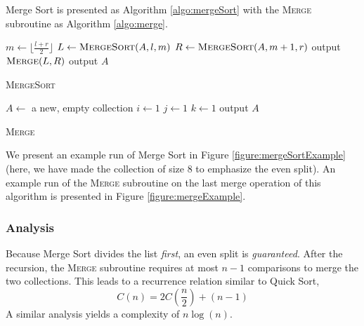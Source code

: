Merge Sort is presented as Algorithm \ref{algo:mergeSort} with the
\textsc{Merge} subroutine as Algorithm \ref{algo:merge}.

\begin{algorithm}
   {
    $m \leftarrow \lfloor\frac{l+r}{2}\rfloor$ \;
    $L \leftarrow \textsc{MergeSort}(A, l, m)$ \;
    $R \leftarrow \textsc{MergeSort}(A, m+1, r)$ \;
    output $\textsc{Merge}(L, R)$ \;    
  }{
    output $A$ \;
  }
\caption{\textsc{MergeSort}}
\label{algo:mergeSort}
\end{algorithm}

\begin{algorithm}[H]
  $A \leftarrow $ a new, empty collection \;
  $i \leftarrow 1$ \;
  $j \leftarrow 1$ \;
  $k \leftarrow 1$  \;
  output $A$ \;
\caption{\textsc{Merge}}
\label{algo:merge}
\end{algorithm}

We present an example run of Merge Sort in Figure \ref{figure:mergeSortExample}
(here, we have made the collection of size 8 to emphasize the even split).  
An example run of the \textsc{Merge} subroutine on the last merge operation
of this algorithm is presented in Figure \ref{figure:mergeExample}.



\subsubsection{Analysis}

Because Merge Sort divides the list \emph{first}, an even split is
\emph{guaranteed}.  After the recursion, the \textsc{Merge} subroutine
requires at most $n-1$ comparisons to merge the two collections.  This
leads to a recurrence relation similar to Quick Sort, 
  $$C(n) = 2C\left( \frac{n}{2} \right) + (n-1)$$
A similar analysis yields a complexity of $n \log{(n)}$.

